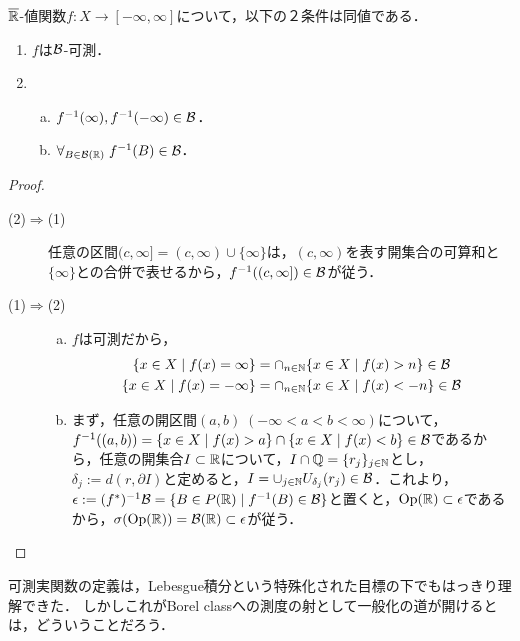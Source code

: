 \documentclass[uplatex, dvipdfmx]{jsreport}
\begin{document}
\begin{theorem}
    $\overline{\mathbb{R}}$-値関数$f:X\to[-\infty,\infty]$について，以下の２条件は同値である．
    \begin{enumerate}
        \item $f$は$\mathcal{B}$-可測．
        \item \begin{enumerate}[(a)]
            \item $f^{-1}(\infty),f^{-1}(-\infty)\in\mathcal{B}$．
            \item $\forall_{B\in\mathcal{B}(\mathbb{R})}\;f^{-1}(B)\in\mathcal{B}$．
        \end{enumerate}
    \end{enumerate}
\end{theorem}
\begin{proof}\mbox{}
    \begin{description}
        \item[(2)$\Rightarrow$(1)] 任意の区間$(c,\infty]=(c,\infty)\cup\{\infty\}$は，$(c,\infty)$を表す開集合の可算和と$\{\infty\}$との合併で表せるから，$f^{-1}((c,\infty])\in\mathcal{B}$が従う．
        \item[(1)$\Rightarrow$(2)] 
        \begin{enumerate}[(a)]
            \item $f$は可測だから，\begin{align*}
                \{x\in X\mid f(x)=\infty\}&=\cap_{n\in\mathbb{N}}\{x\in X\mid f(x)>n\}\in\mathcal{B}\\
                \{x\in X\mid f(x)=-\infty\}&=\cap_{n\in\mathbb{N}}\{x\in X\mid f(x)<-n\}\in\mathcal{B}
            \end{align*}
            \item まず，任意の開区間$(a,b)\;(-\infty<a<b<\infty)$について，$f^{-1}((a,b))=\{x\in X\mid f(x)>a\}\cap\{x\in X\mid f(x)<b\}\in\mathcal{B}$であるから，任意の開集合$I\subset\mathbb{R}$について，$I\cap\mathbb{Q}=\{r_j\}_{j\in\mathbb{N}}$とし，$\delta_j:=d(r,\partial I)$と定めると，$I=\cup_{j\in\mathbb{N}}U_{\delta_j}(r_j)\in\mathcal{B}$．これより，$\epsilon:=(f^*)^{-1}\mathcal{B}=\{B\in P(\mathbb{R})\mid f^{-1}(B)\in\mathcal{B}\}$と置くと，$\mathrm{Op}(\mathbb{R})\subset\epsilon$であるから，$\sigma(\mathrm{Op}(\mathbb{R}))=\mathcal{B}(\mathbb{R})\subset\epsilon$が従う．
        \end{enumerate}
    \end{description}
\end{proof}
\begin{remarks}
    可測実関数の定義は，Lebesgue積分という特殊化された目標の下でもはっきり理解できた．
    しかしこれがBorel classへの測度の射として一般化の道が開けるとは，どういうことだろう．
\end{remarks}
\end{document}
